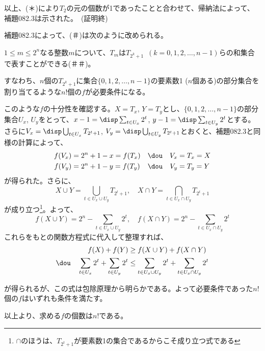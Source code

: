以上、(＊)により$T_2$の元の個数が1であったことと合わせて、帰納法によって、補題082.3は示された。~(証明終)

補題082.3によって、(＃)は次のように改められる。

$1\le m\le 2^n$なる整数$m$について、$T_m$は$T_{2^k+1}$~$(k=0, 1, 2,\dots, n-1)$らの和集合で表すことができる(＃＃)。

すなわち、$n$個の$T_{2^k+1}$に集合$\{0, 1, 2,\dots, n-1\}$の要素数1 ($n$個ある)の部分集合を割り当てるような$n!$個の$f$が必要条件になる。

このような$f$の十分性を確認する。$X=T_x$, $Y=T_y$とし、$\{0, 1, 2,\dots, n-1\}$の部分集合$U_x$, $U_y$をとって、$x-1=\disp \sum_{t\in U_x} 2^t$, $y-1=\disp \sum_{t\in U_y} 2^t$とする。さらに$V_x=\disp \bigcup_{t\in U_x} T_{2^t+1}$, $V_y=\disp \bigcup_{t\in U_y} T_{2^t+1}$とおくと、補題082.3と同様の計算によって、
\begin{align*}
 f(V_x)&=2^n+1-x=f(T_x) & &\dou & V_x&=T_x=X \\
 f(V_y)&=2^n+1-y=f(T_y) & &\dou & V_y&=T_y=Y
\end{align*}
が得られた。さらに、
\[ X\cup Y=\bigcup_{t\in U_x\cup U_y} T_{2^t+1},\quad X\cap Y=\bigcap_{t\in U_x\cap U_y} T_{2^t+1} \]
が成り立つ\footnote{$\cap$のほうは、$T_{2^t+1}$が要素数1の集合であるからこそ成り立つ式である}。よって、
\[ f(X\cup Y)=2^n-\sum_{t\in U_x\cup U_y} 2^t,\quad f(X\cap Y)=2^n-\sum_{t\in U_x\cap U_y} 2^t \]
これらをもとの関数方程式に代入して整理すれば、
\begin{align*}
 f(X)+f(Y) &\ge f(X\cup Y)+f(X\cap Y) \\
\dou\quad \sum_{t\in U_x} 2^t +\sum_{t\in U_y} 2^t &\le \sum_{t\in U_x\cup U_y} 2^t +\sum_{t\in U_x\cap U_y} 2^t
\end{align*}
 
が得られるが、この式は包除原理から明らかである。よって必要条件であった$n!$個の$f$はいずれも条件を満たす。

以上より、求める$f$の個数は$n!$である。